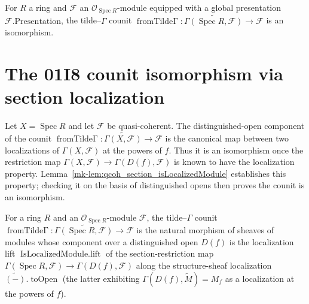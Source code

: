 \begin{lemma}
  \label{mk-lem:isIso_fromTildeGamma_of_presentation}
  \mathlibok

  For \(R\) a ring and \(\mathcal{F}\) an \(\mathcal{O}_{\operatorname{Spec} R}\)-module equipped with
  a global presentation \(\mathcal{F}.\mathrm{Presentation}\), the tilde–\(\Gamma\) counit
  \(\operatorname{fromTilde\Gamma} : \widetilde{\Gamma(\operatorname{Spec} R, \mathcal{F})} \to
  \mathcal{F}\) is an isomorphism.
\end{lemma}

\section{The 01I8 counit isomorphism via section localization}

Let \(X=\operatorname{Spec}R\) and let \(\mathcal F\) be quasi-coherent. The
distinguished-open component of the counit
\(\operatorname{fromTilde\Gamma}:\widetilde{\Gamma(X,\mathcal F)}\to\mathcal F\)
is the canonical map between two localizations of \(\Gamma(X,\mathcal F)\) at the
powers of \(f\). Thus it is an isomorphism once the restriction map
\(\Gamma(X,\mathcal F)\to\Gamma(D(f),\mathcal F)\) is known to have the localization
property. Lemma~\ref{mk-lem:qcoh_section_isLocalizedModule} establishes this property;
checking it on the basis of distinguished opens then proves the counit is an
isomorphism.

\begin{lemma}
  \label{mk-lem:fromTildeGamma_mathlib}
  \mathlibok

  For a ring \(R\) and an \(\mathcal{O}_{\operatorname{Spec} R}\)-module \(\mathcal{F}\), the
  tilde--\(\Gamma\) counit
  \(\operatorname{fromTilde\Gamma} : \widetilde{\Gamma(\operatorname{Spec} R, \mathcal{F})} \to
  \mathcal{F}\) is the natural morphism of sheaves of modules whose component over a distinguished
  open \(D(f)\) is the localization lift \(\operatorname{IsLocalizedModule.lift}\) of the
  section-restriction map \(\Gamma(\operatorname{Spec} R, \mathcal{F}) \to \Gamma(D(f), \mathcal{F})\)
  along the structure-sheaf localization \(\widetilde{(-)}.\operatorname{toOpen}\) (the latter
  exhibiting \(\Gamma(D(f), \widetilde{M}) = M_f\) as a localization at the powers of \(f\)).
\end{lemma}

